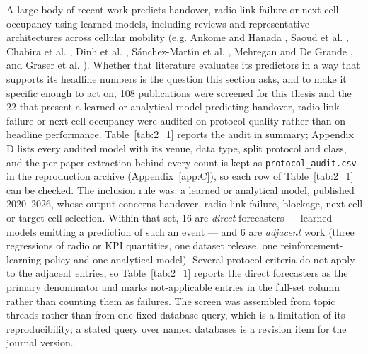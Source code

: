 A large body of recent work predicts handover, radio-link failure or next-cell occupancy using learned models, including reviews and representative architectures across cellular mobility (e.g. Ankome and Hanada \cite{ref7}, Saoud et al. \cite{ref8}, Chabira et al. \cite{ref9}, Dinh et al. \cite{ref10}, S\'anchez-Mart\'{\i}n et al. \cite{ref11}, Mehregan and De Grande \cite{ref12}, and Graser et al. \cite{ref13}). Whether that literature evaluates its predictors in a way that supports its headline numbers is the question this section asks, and to make it specific enough to act on, 108 publications were screened for this thesis and the 22 that present a learned or analytical model predicting handover, radio-link failure or next-cell occupancy were audited on protocol quality rather than on headline performance. Table~\ref{tab:2_1} reports the audit in summary; Appendix D lists every audited model with its venue, data type, split protocol and class, and the per-paper extraction behind every count is kept as \texttt{protocol\_audit.csv} in the reproduction archive (Appendix~\ref{app:C}), so each row of Table~\ref{tab:2_1} can be checked. The inclusion rule was: a learned or analytical model, published 2020--2026, whose output concerns handover, radio-link failure, blockage, next-cell or target-cell selection. Within that set, 16 are \emph{direct} forecasters --- learned models emitting a prediction of such an event --- and 6 are \emph{adjacent} work (three regressions of radio or KPI quantities, one dataset release, one reinforcement-learning policy and one analytical model). Several protocol criteria do not apply to the adjacent entries, so Table~\ref{tab:2_1} reports the direct forecasters as the primary denominator and marks not-applicable entries in the full-set column rather than counting them as failures. The screen was assembled from topic threads rather than from one fixed database query, which is a limitation of its reproducibility; a stated query over named databases is a revision item for the journal version.


